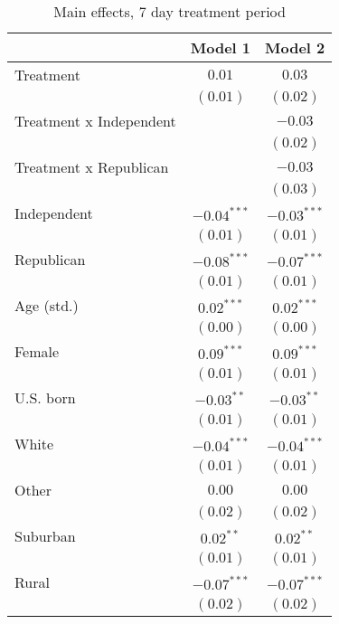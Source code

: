 
\begin{table}
\caption{Main effects, 7 day treatment period}
\begin{center}
\begin{tabular}{l c c}
\toprule
 & Model 1 & Model 2 \\
\midrule
Treatment               & $0.01$        & $0.03$        \\
                        & $(0.01)$      & $(0.02)$      \\
Treatment x Independent &               & $-0.03$       \\
                        &               & $(0.02)$      \\
Treatment x Republican  &               & $-0.03$       \\
                        &               & $(0.03)$      \\
Independent             & $-0.04^{***}$ & $-0.03^{***}$ \\
                        & $(0.01)$      & $(0.01)$      \\
Republican              & $-0.08^{***}$ & $-0.07^{***}$ \\
                        & $(0.01)$      & $(0.01)$      \\
Age (std.)              & $0.02^{***}$  & $0.02^{***}$  \\
                        & $(0.00)$      & $(0.00)$      \\
Female                  & $0.09^{***}$  & $0.09^{***}$  \\
                        & $(0.01)$      & $(0.01)$      \\
U.S. born               & $-0.03^{**}$  & $-0.03^{**}$  \\
                        & $(0.01)$      & $(0.01)$      \\
White                   & $-0.04^{***}$ & $-0.04^{***}$ \\
                        & $(0.01)$      & $(0.01)$      \\
Other                   & $0.00$        & $0.00$        \\
                        & $(0.02)$      & $(0.02)$      \\
Suburban                & $0.02^{**}$   & $0.02^{**}$   \\
                        & $(0.01)$      & $(0.01)$      \\
Rural                   & $-0.07^{***}$ & $-0.07^{***}$ \\
                        & $(0.02)$      & $(0.02)$      \\

\end{tabular}
\end{center}
\end{table}
